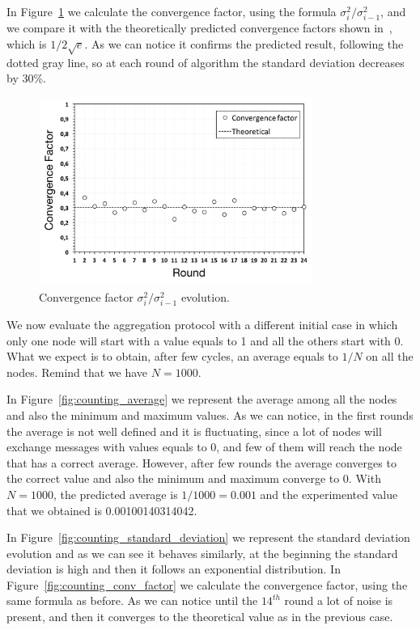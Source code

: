 In Figure~\ref{fig:aggregation_conv_factor} we calculate the convergence factor, using the formula $\sigma_i^2 / \sigma_{i-1}^2$, and we compare it with the theoretically predicted convergence factors shown in~\cite{aggregation}, which is $1 / 2\sqrt{e}$. As we can notice it confirms the predicted result, following the dotted gray line, so at each round of algorithm the standard deviation decreases by 30\%.

\begin{figure}[ht]
  \centering
  \includegraphics[keepaspectratio=true, width=0.8\textwidth]{images/aggregation_conv_factor}\caption{Convergence factor $\sigma_i^2 / \sigma_{i-1}^2$ evolution.}
  \label{fig:aggregation_conv_factor}
\end{figure}


\newpage
We now evaluate the aggregation protocol with a different initial case in which only one node will start with a value equals to 1 and all the others start with 0. What we expect is to obtain, after few cycles, an average equals to $1/N$ on all the nodes. Remind that we have $N = 1000$.

In Figure~\ref{fig:counting_average} we represent the average among all the nodes and also the minimum and maximum values. As we can notice, in the first rounds the average is not well defined and it is fluctuating, since a lot of nodes will exchange messages with values equals to 0, and few of them will reach the node that has a correct average. However, after few rounds the average converges to the correct value and also the minimum and maximum converge to 0. With $N = 1000$, the predicted average is $1 / 1000 = 0.001$ and the experimented value that we obtained is 0.00100140314042.

In Figure~\ref{fig:counting_standard_deviation} we represent the standard deviation evolution and as we can see it behaves similarly, at the beginning the standard deviation is high and then it follows an exponential distribution. In Figure~\ref{fig:counting_conv_factor} we calculate the convergence factor, using the same formula as before. As we can notice until the $14^{th}$ round a lot of noise is present, and then it converges to the theoretical value as in the previous case.

